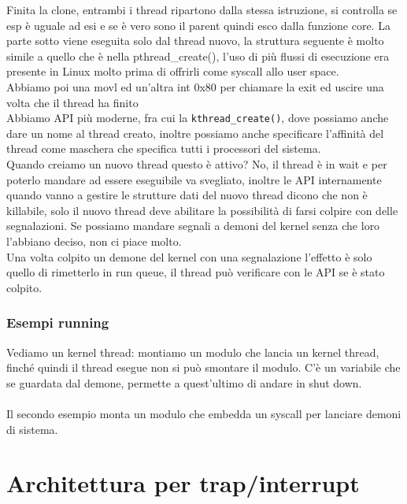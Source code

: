\documentclass[12pt, oneside]{extbook}
\begin{document}
Finita la clone, entrambi i thread ripartono dalla stessa istruzione, si controlla se esp è uguale ad esi e se è vero sono il parent quindi esco dalla funzione core. La parte sotto viene eseguita solo dal thread nuovo, la struttura seguente è molto simile a quello che è nella pthread\_create(), l'uso di più flussi di esecuzione era presente in Linux molto prima di offrirli come syscall allo user space.\\Abbiamo poi una movl ed un'altra int 0x80 per chiamare la exit ed uscire una volta che il thread ha finito\\Abbiamo API più moderne, fra cui la \texttt{kthread\_create()}, dove possiamo anche dare un nome al thread creato, inoltre possiamo anche specificare l'affinità del thread come maschera che specifica tutti i processori del sistema.\\Quando creiamo un nuovo thread questo è attivo? No, il thread è in wait e per poterlo mandare ad essere eseguibile va svegliato, inoltre le API internamente quando vanno a gestire le strutture dati del nuovo thread dicono che non è killabile, solo il nuovo thread deve abilitare la possibilità di farsi colpire con delle segnalazioni. Se possiamo mandare segnali a demoni del kernel senza che loro l'abbiano deciso, non ci piace molto.\\Una volta colpito un demone del kernel con una segnalazione l'effetto è solo quello di rimetterlo in run queue, il thread può verificare con le API se è stato colpito.
\subsection{Esempi running}
Vediamo un kernel thread: montiamo un modulo che lancia un kernel thread, finché quindi il thread esegue non si può smontare il modulo. C'è un variabile che se guardata dal demone, permette a quest'ultimo di andare in shut down.\\\\Il secondo esempio monta un modulo che embedda un syscall per lanciare demoni di sistema.
\chapter{Architettura per trap/interrupt}
\end{document}
